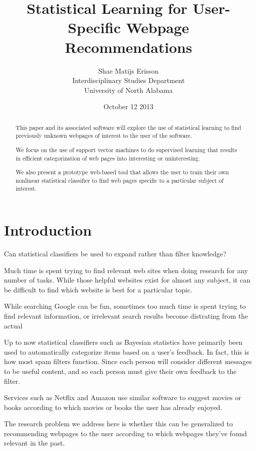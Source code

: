 \documentclass[12pt]{article}
\author{Shae Matijs Erisson\\Interdisciplinary Studies Department\\University of North Alabama}
\title{Statistical Learning for User-Specific Webpage Recommendations}
\date{October 12 2013}
\begin{document}
\maketitle{}
\pagebreak{}

\begin{abstract}
  This paper and its associated software will explore the use of statistical learning to find previously
  unknown webpages of interest to the user of the software.

  We focus on the use of support vector machines to do supervised learning that results in efficient
  categorization of web pages into interesting or uninteresting.

  We also present a prototype web-based tool that allows the user to train their own nonlinear statistical
  classifier to find web pages specific to a particular subject of interest.
\end{abstract}
\pagebreak{}
\tableofcontents{}
\pagebreak{}
\section{Introduction}
Can statistical classifiers be used to expand rather than filter knowledge?

Much time is spent trying to find relevant web sites when doing research for any number of tasks. While those
helpful websites exist for almost any subject, it can be difficult to find which website is best for a
particular topic.

While searching Google can be fun, sometimes too much time is spent trying to find relevant information, or
irrelevant search results become distrating from the actual

Up to now statistical classifiers such as Bayesian statistics have primarily been used to automatically
categorize items based on a user's feedback. In fact, this is how most spam filters function. Since each
person will consider different messages to be useful content, and so each person must give their own feedback
to the filter.

Services such as Netflix and Amazon use similar software to suggest movies or books according to which movies
or books the user has already enjoyed.

The research problem we address here is whether this can be generalized to recommending webpages to the user
according to which webpages they've found relevant in the past.
\end{document}
